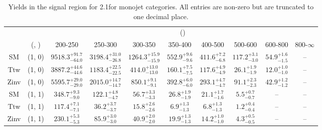\begin{table}[h!]
\tiny
\centering
\caption{Yields in the signal region for 2.1\ifb for monojet categories. All entries are non-zero but are truncated to one decimal place.\label{tab:yieldsnodata_sig_comb_mono}}
\begin{tabular}
{cccccccccc}
	\hline\hline
	&	& \multicolumn{8}{c}{\scalht (\gev)}\\ 
	&	 (\njet, \nb) & 200-250 & 250-300 & 300-350 & 350-400 & 400-500 & 500-600 & 600-800 & 800-$\infty$ \\ [0.8ex] 
\hline
	SM & (1, 0) & $9518.3^{+ 91.7 }_{- 64.0 }$ & $3198.4^{+ 31.0 }_{- 26.8 }$ & $1264.3^{+ 15.9 }_{- 15.9 }$ & $552.9^{+ 9.6 }_{- 9.6 }$ & $411.6^{+ 7.2 }_{- 6.8 }$ & $117.2^{+ 3.1 }_{- 3.0 }$ & $54.9^{+ 1.6 }_{- 1.5 }$ & -- \\[0.5ex] 
	Ttw & (1, 0) & $3887.2^{+ 44.6 }_{- 44.6 }$ & $1183.4^{+ 22.5 }_{- 22.5 }$ & $414.0^{+ 13.0 }_{- 13.0 }$ & $160.1^{+ 7.5 }_{- 7.5 }$ & $117.6^{+ 4.9 }_{- 4.9 }$ & $26.1^{+ 1.9 }_{- 1.9 }$ & $12.0^{+ 1.0 }_{- 1.0 }$ & -- \\[0.5ex] 
	Zinv & (1, 0) & $5595.7^{+ 29.0 }_{- 29.0 }$ & $2015.0^{+ 14.7 }_{- 14.7 }$ & $850.1^{+ 9.1 }_{- 9.1 }$ & $392.8^{+ 6.0 }_{- 6.0 }$ & $293.1^{+ 4.7 }_{- 4.7 }$ & $91.1^{+ 2.3 }_{- 2.3 }$ & $42.9^{+ 1.2 }_{- 1.2 }$ & -- \\[0.5ex] 
	SM & (1, 1) & $348.7^{+ 9.3 }_{- 9.0 }$ & $122.1^{+ 4.8 }_{- 4.7 }$ & $56.7^{+ 3.3 }_{- 3.3 }$ & $26.8^{+ 1.9 }_{- 1.9 }$ & $21.1^{+ 1.7 }_{- 1.6 }$ & $5.5^{+ 0.7 }_{- 0.7 }$ & -- & -- \\[0.5ex] 
	Ttw & (1, 1) & $117.4^{+ 7.1 }_{- 7.1 }$ & $36.2^{+ 3.7 }_{- 3.7 }$ & $15.8^{+ 2.6 }_{- 2.6 }$ & $6.9^{+ 1.3 }_{- 1.3 }$ & $6.8^{+ 1.3 }_{- 1.3 }$ & $1.2^{+ 0.4 }_{- 0.4 }$ & -- & -- \\[0.5ex] 
	Zinv & (1, 1) & $230.1^{+ 5.3 }_{- 5.3 }$ & $85.9^{+ 3.0 }_{- 3.0 }$ & $40.9^{+ 2.0 }_{- 2.0 }$ & $19.9^{+ 1.3 }_{- 1.3 }$ & $14.2^{+ 1.0 }_{- 1.0 }$ & $4.3^{+ 0.5 }_{- 0.5 }$ & -- & -- \\[0.5ex] 
	\hline
	\hline
\end{tabular}
\end{table}
